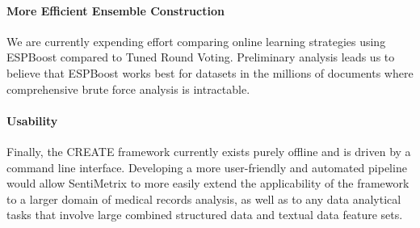 \paragraph{More Efficient Ensemble Construction} We are currently expending effort comparing online learning strategies using \textsf{ESPBoost} \cite{espboost} compared to \textsf{Tuned Round Voting}. Preliminary analysis leads us to believe that \textsf{ESPBoost} works best for datasets in the millions of documents where comprehensive brute force analysis is intractable.

\paragraph{Usability} Finally, the CREATE framework currently exists purely offline and is driven by a command line interface. Developing a more user-friendly and automated pipeline would allow SentiMetrix to more easily extend the applicability of the framework to a larger domain of medical records
analysis, as well as to any data analytical tasks that involve large combined structured data and textual data feature sets.
